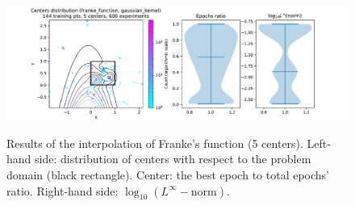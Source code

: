 \documentclass[12pt]{report} %
\begin{document}
\begin{figure}[H]
  {\includegraphics[width=\textwidth, trim={2cm 0 2.8cm 0}, clip=true]{imagenes/experiments/2d/franke_interpolation/tr12_c5_franke_function_gaussian_kernel.pdf}}
  \caption{Results of the interpolation of Franke's function (5 centers).
    Left-hand side: distribution of centers with respect to the problem domain (black rectangle). Center: the best epoch to total epochs' ratio.
    Right-hand side: $\log_{10}(L^\infty-\text{norm})$.}
  \label{fig:franke-tr12-c5}
\end{figure}
\end{document}
